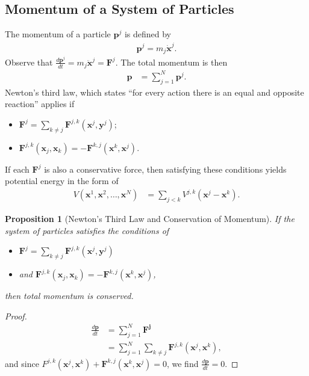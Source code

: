 \documentclass[12pt]{extarticle}
\theoremstyle{plain}
\newtheorem*{proposition}{Proposition}%
\theoremstyle{definition}
\theoremstyle{remark}
\begin{document}
  \subsection{Momentum of a System of Particles}%
  The momentum of a particle $\mathbf{p}^j$ is defined by
  \begin{align*}
    \mathbf{p}^j = m_j\mathbf{\dot{x}}^j.
  \end{align*}
  Observe that $\frac{d\mathbf{p}^j}{dt} = m_j\mathbf{\ddot{x}}^j = \mathbf{F}^j$. The total momentum is then
  \begin{align*}
    \mathbf{p} &= \sum_{j=1}^{N}\mathbf{p}^j.
  \end{align*}
  Newton's third law, which states ``for every action there is an equal and opposite reaction'' applies if 
  \begin{itemize}
    \item $\displaystyle \mathbf{F}^j = \sum_{k\neq j}\mathbf{F}^{j,k}(\mathbf{x}^j,\mathbf{y}^j)$;
    \item $\displaystyle \mathbf{F}^{j,k}(\mathbf{x}_j,\mathbf{x}_k) = -\mathbf{F}^{k,j}(\mathbf{x}^k,\mathbf{x}^j)$.
  \end{itemize}
  If each $\mathbf{F}^j$ is also a conservative force, then satisfying these conditions yields potential energy in the form of
  \begin{align*}
    V(\mathbf{x}^1,\mathbf{x}^2,\dots,\mathbf{x}^N) &= \sum_{j < k}V^{j,k}(\mathbf{x}^{j} - \mathbf{x}^{k}).
  \end{align*}
  \begin{proposition}[Newton's Third Law and Conservation of Momentum]
  If the system of particles satisfies the conditions of
  \begin{itemize}
    \item $\displaystyle \mathbf{F}^j = \sum_{k\neq j}\mathbf{F}^{j,k}(\mathbf{x}^j,\mathbf{y}^j)$
    \item and $\displaystyle \mathbf{F}^{j,k}(\mathbf{x}_j,\mathbf{x}_k) = -\mathbf{F}^{k,j}(\mathbf{x}^k,\mathbf{x}^j)$,
  \end{itemize}
  then total momentum is conserved.
  \end{proposition}
  \begin{proof}
      \begin{align*}
        \frac{d\mathbf{p}}{dt} &= \sum_{j=1}^{N}\mathbf{F^{j}}\\
                            &= \sum_{j=1}^{N}\sum_{k\neq j}\mathbf{F}^{j,k}(\mathbf{x}^j,\mathbf{x}^{k}),
      \end{align*}
      and since $F^{j,k}(\mathbf{x}^j,\mathbf{x}^k) + \mathbf{F}^{k,j}(\mathbf{x}^k,\mathbf{x}^j) = 0$, we find $\frac{d\mathbf{p}}{dt} = 0$.
  \end{proof}
\end{document}
